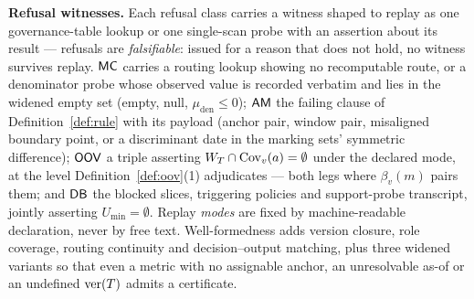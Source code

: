 \smallskip\noindent{}\textbf{Refusal witnesses.}\label{sec:cert:witness}
Each refusal class carries a witness shaped to replay as one governance-table
lookup or one single-scan probe with an assertion about its result ---
refusals are \emph{falsifiable}: issued for a reason that does not hold, no
witness survives replay. $\mathsf{MC}$ carries a routing
lookup showing no recomputable route, or a
denominator probe whose observed value is recorded verbatim and lies
in the widened empty set (empty, null, $\mu_{\mathrm{den}}\le0$); $\mathsf{AM}$ the
failing clause of Definition~\ref{def:rule} with its
payload (anchor pair, window pair, misaligned boundary
point, or a discriminant date in the
marking sets' symmetric difference); $\mathsf{OOV}$ a triple asserting
$W_T\cap\mathrm{Cov}_v(a)=\emptyset$ under the declared mode, at the level
Definition~\ref{def:oov}(1) adjudicates --- both legs where $\beta_v(m)$ pairs
them; and $\mathsf{DB}$ the blocked
slices, triggering policies and support-probe transcript,
jointly asserting $U_{\min}=\emptyset$. Replay \emph{modes} are fixed
by machine-readable declaration, never by free text. Well-formedness adds
version closure, role coverage, routing continuity and decision--output
matching, plus three widened variants so that even a metric with no
assignable anchor, an unresolvable as-of or an undefined $\mathrm{ver}(T)$ admits a
certificate.


